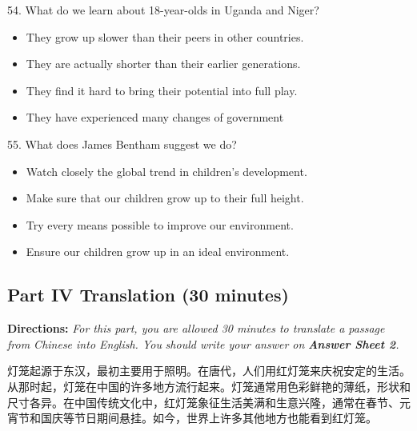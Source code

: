 \documentclass[UTF8,11pt]{ctexart}
\begin{document}
54. What do we learn about 18-year-olds in Uganda and Niger?


\begin{itemize}[leftmargin=2em,itemsep=.2em,topsep=.4em]\item[A.] They grow up slower than their peers in other countries.
\item[B.] They are actually shorter than their earlier generations.
\item[C.] They find it hard to bring their potential into full play.
\item[D.] They have experienced many changes of government
\end{itemize}

55. What does James Bentham suggest we do?


\begin{itemize}[leftmargin=2em,itemsep=.2em,topsep=.4em]\item[A.] Watch closely the global trend in children’s development.
\item[B.] Make sure that our children grow up to their full height.
\item[C.] Try every means possible to improve our environment.
\item[D.] Ensure our children grow up in an ideal environment.
\end{itemize}

\subsection*{\textbf{Part} IV \textbf{Translation} \textbf{(30 minutes)}}


\textbf{Directions:}\textit{ For this part, you are allowed 30 minutes to translate a passage from Chinese into English. You} \textit{should write your answer on}\textbf{\textit{ Answer Sheet 2}}\textit{.}


灯笼起源于东汉，最初主要用于照明。在唐代，人们用红灯笼来庆祝安定的生活。从那时起，灯笼在中国的许多地方流行起来。灯笼通常用色彩鲜艳的薄纸，形状和尺寸各异。在中国传统文化中，红灯笼象征生活美满和生意兴隆，通常在春节、元宵节和国庆等节日期间悬挂。如今，世界上许多其他地方也能看到红灯笼。
\end{document}
